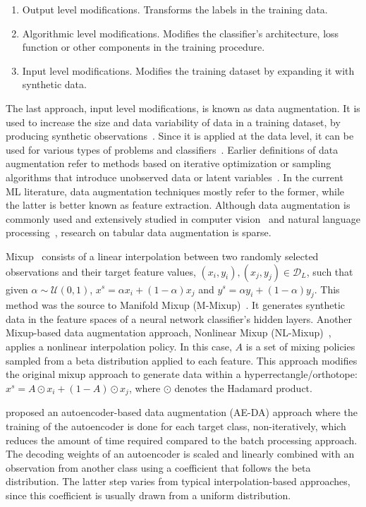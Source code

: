 \documentclass[parskip=full]{scrartcl}
\begin{document}
\begin{enumerate}
    \item Output level modifications. Transforms the labels in the training
        data.
    \item Algorithmic level modifications. Modifies the classifier's
        architecture, loss function or other components in the training
        procedure.
    \item Input level modifications. Modifies the training dataset by
        expanding it with synthetic data.
\end{enumerate}

The last approach, input level modifications, is known as data augmentation.
It is used to increase the size and data variability of data in a training
dataset, by producing synthetic observations~\cite{Van2001, Wong2016}. Since
it is applied at the data level, it can be used for various types of problems
and classifiers~\cite{Behpour2019}. Earlier definitions of data augmentation
refer to methods based on iterative optimization or sampling algorithms that
introduce unobserved data or latent variables~\cite{van2001art}. In the
current ML literature, data augmentation techniques mostly refer to the
former, while the latter is better known as feature extraction. Although data
augmentation is commonly used and extensively studied in computer
vision~\cite{shorten2019survey} and natural language
processing~\cite{feng2021survey}, research on tabular data augmentation is
sparse.

Mixup~\cite{zhang2018mixup} consists of a linear interpolation between two
randomly selected observations and their target feature values, $(x_i, y_i),
(x_j, y_j) \in \mathcal{D}_L$, such that given $\alpha \sim \mathcal{U}(0,1)$,
$x^s = \alpha x_i + (1-\alpha) x_j$ and $y^s = \alpha y_i + (1-\alpha) y_j$.
This method was the source to Manifold Mixup
(M-Mixup)~\cite{verma2019manifold}. It generates synthetic data in the feature
spaces of a neural network classifier's hidden layers. Another Mixup-based
data augmentation approach, Nonlinear Mixup
(NL-Mixup)~\cite{guo2020nonlinear}, applies a nonlinear interpolation policy.
In this case, $A$ is a set of mixing policies sampled from a beta distribution
applied to each feature. This approach modifies the original mixup approach to
generate data within a hyperrectangle/orthotope: $x^s = A \odot x_i + (1-A)
\odot x_j$, where $\odot$ denotes the Hadamard product.

\citet{feng2020autuencoder} proposed an autoencoder-based data augmentation
(AE-DA) approach where the training of the autoencoder is done for each target
class, non-iteratively, which reduces the amount of time required compared to
the batch processing approach. The decoding weights of an autoencoder is
scaled and linearly combined with an observation from another class using a
coefficient that follows the beta distribution. The latter step varies from
typical interpolation-based approaches, since this coefficient is usually
drawn from a uniform distribution.
\end{document}
